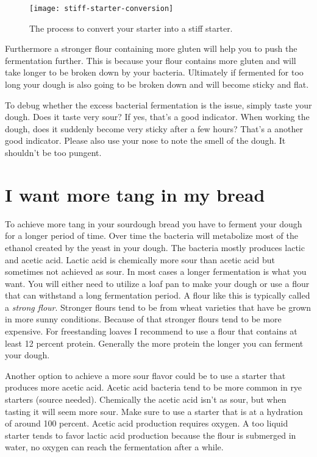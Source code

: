 \begin{figure}[!htb]
  \texttt{[image: stiff-starter-conversion]}
  \caption{The process to convert your starter into a stiff starter.}
  \label{fig:stiff-starter-conversion}
\end{figure}

Furthermore a stronger flour containing more gluten
will help you to push the fermentation further. This
is because your flour contains more gluten and will
take longer to be broken down by your bacteria. Ultimately
if fermented for too long your dough is also going
to be broken down and will become sticky and flat.

To debug whether the excess bacterial fermentation is the issue,
simply taste your dough. Does it taste very sour? If yes,
that's a good indicator. When working the dough, does it
suddenly become very sticky after a few hours? That's a
another good indicator. Please also use your nose to note
the smell of the dough. It shouldn't be too pungent.

\section{I want more tang in my bread}

To achieve more tang in your sourdough bread you have
to ferment your dough for a longer period of time.
Over time the bacteria will metabolize most of the
ethanol created by the yeast in your dough. The bacteria
mostly produces lactic and acetic acid. Lactic acid
is chemically more sour than acetic acid but sometimes
not achieved as sour. In most cases a longer fermentation
is what you want. You will either need to utilize a loaf
pan to make your dough or use a flour that can withstand
a long fermentation period. A flour like this is typically
called a {\it strong flour}. Stronger flours tend
to be from wheat varieties that have be grown in more
sunny conditions. Because of that stronger flours tend
to be more expensive. For freestanding loaves I recommend
to use a flour that contains at least 12 percent protein.
Generally the more protein the longer you can ferment your dough.

Another option to achieve a more sour flavor could be to
use a starter that produces more acetic acid. Acetic acid
bacteria tend to be more common in rye starters (source needed).
Chemically the acetic acid isn't as sour, but when tasting
it will seem more sour. Make sure to use a starter that is at
a hydration of around 100 percent. Acetic acid production
requires oxygen. A too liquid starter tends to favor lactic
acid production because the flour is submerged in water, no
oxygen can reach the fermentation after a while.

